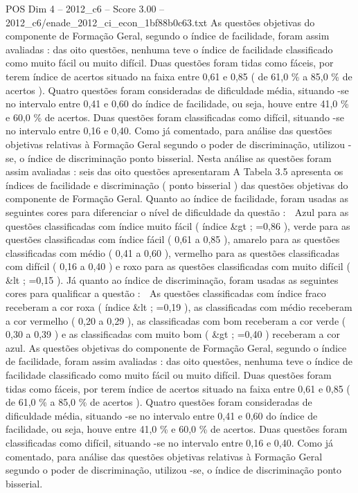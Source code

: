 \begin{textsample}{POS Dim 4 – 2012\_c6 – Score 3.00 – 2012\_c6/enade\_2012\_ci\_econ\_1bf88b0c63.txt}
As questões objetivas do componente de Formação Geral, segundo o índice de facilidade, foram assim avaliadas : das oito questões, nenhuma teve o índice de facilidade classificado como muito fácil ou muito difícil.
Duas questões foram tidas como fáceis, por terem índice de acertos situado na faixa entre 0,61 e 0,85 ( de 61,0 \% a 85,0 \% de acertos ).
Quatro questões foram consideradas de dificuldade média, situando -se no intervalo entre 0,41 e 0,60 do índice de facilidade, ou seja, houve entre 41,0 \% e 60,0 \% de acertos.
Duas questões foram classificadas como difícil, situando -se no intervalo entre 0,16 e 0,40.
Como já comentado, para análise das questões objetivas relativas à Formação Geral segundo o poder de discriminação, utilizou -se, o índice de discriminação ponto bisserial.
Nesta análise as questões foram assim avaliadas : seis das oito questões apresentaram A Tabela 3.5 apresenta os índices de facilidade e discriminação ( ponto bisserial ) das questões objetivas do componente de Formação Geral.
Quanto ao índice de facilidade, foram usadas as seguintes cores para diferenciar o nível de dificuldade da questão :  Azul para as questões classificadas com índice muito fácil ( índice \&gt ; =0,86 ), verde para as questões classificadas com índice fácil ( 0,61 a 0,85 ), amarelo para as questões classificadas com médio ( 0,41 a 0,60 ), vermelho para as questões classificadas com difícil ( 0,16 a 0,40 ) e roxo para as questões classificadas com muito difícil ( \&lt ; =0,15 ).
Já quanto ao índice de discriminação, foram usadas as seguintes cores para qualificar a questão :  As questões classificadas com índice fraco receberam a cor roxa ( índice \&lt ; =0,19 ), as classificadas com médio receberam a cor vermelho ( 0,20 a 0,29 ), as classificadas com bom receberam a cor verde ( 0,30 a 0,39 ) e as classificadas com muito bom ( \&gt ; =0,40 ) receberam a cor azul.
As questões objetivas do componente de Formação Geral, segundo o índice de facilidade, foram assim avaliadas : das oito questões, nenhuma teve o índice de facilidade classificado como muito fácil ou muito difícil.
Duas questões foram tidas como fáceis, por terem índice de acertos situado na faixa entre 0,61 e 0,85 ( de 61,0 \% a 85,0 \% de acertos ).
Quatro questões foram consideradas de dificuldade média, situando -se no intervalo entre 0,41 e 0,60 do índice de facilidade, ou seja, houve entre 41,0 \% e 60,0 \% de acertos.
Duas questões foram classificadas como difícil, situando -se no intervalo entre 0,16 e 0,40.
Como já comentado, para análise das questões objetivas relativas à Formação Geral segundo o poder de discriminação, utilizou -se, o índice de discriminação ponto bisserial.

\end{textsample}
